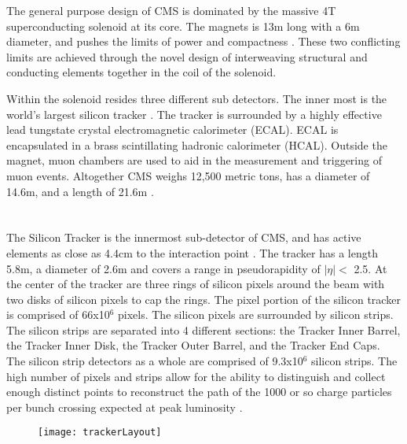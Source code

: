   The general purpose design of CMS is dominated by the massive 4T 
  	superconducting solenoid at its core.
  The magnets is 13m long with a 6m diameter, and pushes the limits of power
  	and compactness \cite{tCmsE}. 
  These two conflicting limits are achieved through the novel design of 
  	interweaving structural and conducting elements together in the coil of
  	the solenoid.

  Within the solenoid resides three different sub detectors.
  The inner most is the world's largest silicon tracker \cite{tCmsE}.
  The tracker is surrounded by a highly effective lead tungstate crystal 
    electromagnetic calorimeter (ECAL).
  ECAL is encapsulated in a brass scintillating hadronic calorimeter (HCAL).
  Outside the magnet, muon chambers are used to aid in the measurement and 
    triggering of muon events. 
  Altogether CMS weighs 12,500 metric tons, has a diameter of 14.6m,
    and a length of 21.6m \cite{tCmsE}.

  \DIFaddbegin \section{}
    \DIFaddend The Silicon Tracker is the innermost sub-detector of CMS, and has active
    	elements as close as 4.4cm to the interaction point \cite{tCmsE}. 
    The tracker has a length 5.8m, a diameter of 2.6m and
    	covers a range in pseudorapidity of \(|\eta| <\) 2.5.
    \DIFdelbegin {}\DIFdelend At the center of the tracker are three rings of silicon pixels around the beam 
    	with two disks of silicon pixels to cap the rings.
    The pixel portion of the silicon tracker is comprised of 66x10$^{6}$
    	pixels.
    The silicon pixels are surrounded by silicon strips.
    The silicon strips are separated into 4 different sections: 
    	the Tracker Inner Barrel, the Tracker Inner Disk, the Tracker Outer 
    	Barrel, and the Tracker End Caps.
    The silicon strip detectors as a whole are comprised of 9.3x10$^{6}$ silicon 
    	strips.
    The high number of pixels and strips allow for the ability to distinguish
    	and collect enough distinct points to reconstruct the path of the 1000
    	or so charge particles per bunch crossing expected at peak luminosity
    	\cite{tCmsE}.

    \DIFaddbegin \begin{figure}[!Hhbt]
      \centering
      \texttt{[image: trackerLayout]}
      \caption{}
      \label{fig:fig:trackerLayout}
    \end{figure}

